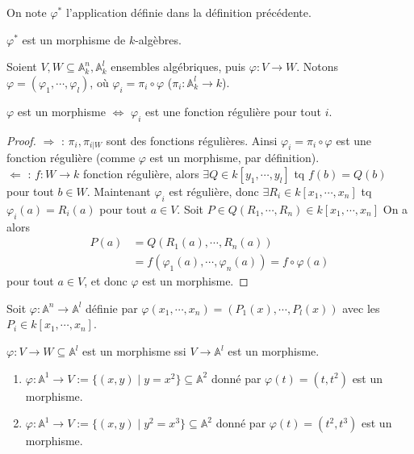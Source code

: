         \begin{nota}
            On note $\varphi^*$ l'application définie dans la définition précédente. 
        \end{nota}
        \begin{remq}
            $\varphi^*$ est un morphisme de $k$-algèbres.
        \end{remq}
        Soient $V,W \subseteq \mathbb{A}_k^n, \mathbb{A}_k^l$ ensembles algébriques, puis $\varphi : V \to W$. Notons $\varphi = (\varphi_1, \cdots, \varphi_l)$, où $\varphi_i = \pi_i \circ \varphi$ ($\pi_i : \mathbb{A}_k^l \to k$). 
        \begin{lemm}
            $\varphi$ est un morphisme $\iff$ $\varphi_i$ est une fonction régulière pour tout $i$.
        \end{lemm}
        \begin{proof}
            $\Rightarrow$ : $\pi_i, \pi_{i|W}$ sont des fonctions régulières. Ainsi $\varphi_i = \pi_i \circ \varphi$ est une fonction régulière (comme $\varphi$ est un morphisme, par définition). \\
            $\Leftarrow$ : $f : W \to k$ fonction régulière, alors $\exists Q \in k[y_1, \cdots, y_l]$ tq $f(b) = Q(b)$ pour tout $b \in W$. Maintenant $\varphi_i$ est régulière, donc $\exists R_i \in k[x_1, \cdots, x_n]$ tq $\varphi_i(a) = R_i(a)$ pour tout $a \in V$. Soit $P \in Q(R_1, \cdots, R_n) \in k[x_1, \cdots, x_n]$ On a alors 
            \begin{align*}
                P(a) &= Q(R_1(a), \cdots, R_n(a)) \\
                &= f(\varphi_1(a), \cdots, \varphi_n(a)) = f \circ \varphi(a)
            \end{align*} 
            pour tout $a \in V$, et donc $\varphi$ est un morphisme.
        \end{proof}
        \begin{expl}
            Soit $\varphi : \mathbb{A}^n \to \mathbb{A}^l$ définie par $\varphi(x_1, \cdots, x_n) = (P_1(x), \cdots, P_l(x))$ avec les $P_i \in k[x_1, \cdots, x_n]$.
        \end{expl}
        \begin{remq}
            $\varphi : V \to W \subseteq \mathbb{A}^l$ est un morphisme ssi $V \to \mathbb{A}^l$ est un morphisme.
        \end{remq}
        \begin{expl}
            \begin{enumerate}
                \item $\varphi : \mathbb{A}^1 \to V := \{(x,y) \mid y = x^2\} \subseteq \mathbb{A}^2$ donné par $\varphi(t) = (t, t^2)$ est un morphisme.
                \item $\varphi : \mathbb{A}^1 \to V := \{(x,y) \mid y^2 = x^3\} \subseteq \mathbb{A}^2$ donné par $\varphi(t) = (t^2, t^3)$ est un morphisme.
            \end{enumerate}
        \end{expl}
